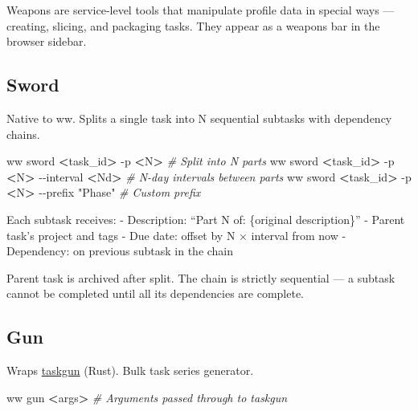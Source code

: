 \documentclass[
]{article}
\newenvironment{Shaded}{\begin{snugshade}}{\end{snugshade}}
\newcommand{\CommentTok}[1]{\textcolor[rgb]{0.56,0.35,0.01}{\textit{#1}}}
\newcommand{\ExtensionTok}[1]{#1}
\newcommand{\NormalTok}[1]{#1}
\newcommand{\OperatorTok}[1]{\textcolor[rgb]{0.81,0.36,0.00}{\textbf{#1}}}
\newcommand{\StringTok}[1]{\textcolor[rgb]{0.31,0.60,0.02}{#1}}
\begin{document}
Weapons are service-level tools that manipulate profile data in special
ways --- creating, slicing, and packaging tasks. They appear as a
weapons bar in the browser sidebar.

\subsection{Sword}\label{sword}

Native to ww. Splits a single task into N sequential subtasks with
dependency chains.

\begin{Shaded}
\begin{Highlighting}[]
\ExtensionTok{ww}\NormalTok{ sword }\OperatorTok{\textless{}}\NormalTok{task\_id}\OperatorTok{\textgreater{}}\NormalTok{ {-}p }\OperatorTok{\textless{}}\NormalTok{N}\OperatorTok{\textgreater{}}                   \CommentTok{\# Split into N parts}
\ExtensionTok{ww}\NormalTok{ sword }\OperatorTok{\textless{}}\NormalTok{task\_id}\OperatorTok{\textgreater{}}\NormalTok{ {-}p }\OperatorTok{\textless{}}\NormalTok{N}\OperatorTok{\textgreater{}}\NormalTok{ {-}{-}interval }\OperatorTok{\textless{}}\NormalTok{Nd}\OperatorTok{\textgreater{}}   \CommentTok{\# N{-}day intervals between parts}
\ExtensionTok{ww}\NormalTok{ sword }\OperatorTok{\textless{}}\NormalTok{task\_id}\OperatorTok{\textgreater{}}\NormalTok{ {-}p }\OperatorTok{\textless{}}\NormalTok{N}\OperatorTok{\textgreater{}}\NormalTok{ {-}{-}prefix }\StringTok{"Phase"}  \CommentTok{\# Custom prefix}
\end{Highlighting}
\end{Shaded}

Each subtask receives: - Description: ``Part N of: \{original
description\}'' - Parent task's project and tags - Due date: offset by N
× interval from now - Dependency: on previous subtask in the chain

Parent task is archived after split. The chain is strictly sequential
--- a subtask cannot be completed until all its dependencies are
complete.

\subsection{Gun}\label{gun}

Wraps \href{https://github.com/hamzamohdzubair/taskgun}{taskgun} (Rust).
Bulk task series generator.

\begin{Shaded}
\begin{Highlighting}[]
\ExtensionTok{ww}\NormalTok{ gun }\OperatorTok{\textless{}}\NormalTok{args}\OperatorTok{\textgreater{}}   \CommentTok{\# Arguments passed through to taskgun}
\end{Highlighting}
\end{Shaded}
\end{document}
